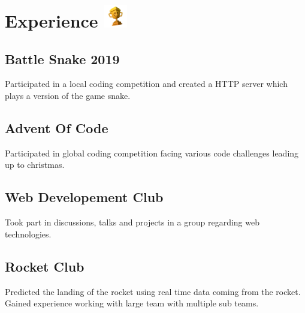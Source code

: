 \documentclass{article}
\newcommand{\hrefColored}[3]{\href{#2}{\color{#1}{#3}}}
\begin{document}
\section{Experience \protect\includegraphics[height=1cm]{trophy.png}}

\subsection{Battle Snake 2019 \hrefColored{blue}{https://github.com/McRaeAlex/BattleSnake2019}{github.com/McRaeAlex/BattleSnake2019}}

Participated in a local coding competition and created a HTTP server
which plays a version of the game snake.

\subsection{Advent Of Code \hrefColored{blue}{https://github.com/McRaeAlex/AdventOfCode2018}{github.com/McRaeAlex/AdventOfCode2018}}

Participated in global coding competition facing various code challenges leading
up to christmas.

\subsection{Web Developement Club}

Took part in discussions, talks and projects in a group regarding web 
technologies.

\subsection{Rocket Club}

Predicted the landing of the rocket using real time data coming from the rocket. Gained experience working with large team with multiple sub teams.
\end{document}

